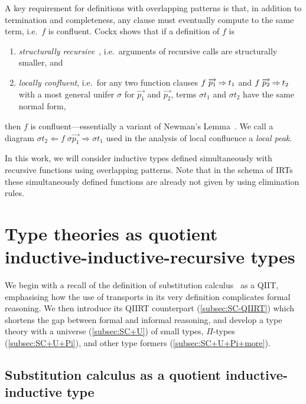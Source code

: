 \documentclass[a4paper,UKenglish,numberwithinsect,cleveref,thm-restate]{lipics-v2021}
\begin{document}
A key requirement for definitions with overlapping patterns is that, in addition to termination and completeness, any clause must eventually compute to the same term, i.e.\ $f$ is confluent.
Cockx shows that if a definition of $f$ is
\begin{enumerate}
  \item \emph{structurally recursive}~\cite{Abel2002}, i.e.\ arguments of recursive calls are structurally smaller, and
  \item \emph{locally confluent}, i.e.\ for any two function clauses $f\;\overrightarrow{p_1} \mathbin{\Rightarrow} t_1$ and $f\;\overrightarrow{p_2} \mathbin{\Rightarrow} t_2$ with a most general unifer $\sigma$ for $\overrightarrow{p_1}$ and $\overrightarrow{p_2}$, terms $\sigma t_1$ and $\sigma t_2$ have the same normal form, 
\end{enumerate}
then $f$ is confluent---essentially a variant of Newman's Lemma~\cite{Newman1942}.
We call a diagram $\sigma t_2 \Leftarrow f\;\sigma\overrightarrow{p_1} \Rightarrow \sigma t_1$ used in the analysis of local confluence a \emph{local peak}.

In this work, we will consider inductive types defined simultaneously with recursive functions using overlapping patterns.
Note that in the schema of IRTs these simultaneously defined functions are already not given by using elimination rules.

\section{Type theories as quotient inductive-inductive-recursive types} \label{sec:QIIRTs}

We begin with a recall of the definition of substitution calculus~\cite{Martin-Lof1992} as a QIIT, emphasising how the use of transports in its very definition complicates formal reasoning.
We then introduce its QIIRT counterpart (\cref{subsec:SC-QIIRT}) which shortens the gap between formal and informal reasoning, and develop a type theory with a universe (\cref{subsec:SC+U}) of small types, $\Pi$-types (\cref{subsec:SC+U+Pi}), and other type formers (\cref{subsec:SC+U+Pi+more}).

\subsection{Substitution calculus as a quotient inductive-inductive type} \label{subsec:SC-QIIT}
\end{document}
